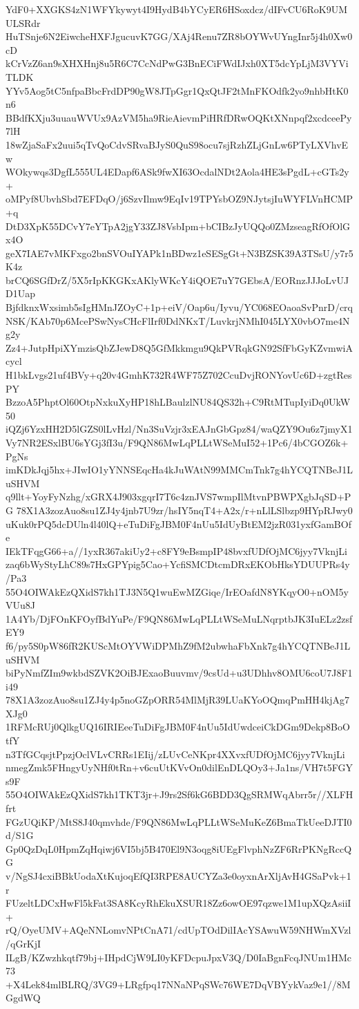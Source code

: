 YdF0+XXGKS4zN1WFYkywyt4I9HydB4bYCyER6HSoxdcz/dIFvCU6RoK9UMULSRdr
HuTSnje6N2EiwcheHXFJgucuvK7GG/XAj4Renu7ZR8bOYWvUYngInr5j4h0Xw0cD
kCrVzZ6an9sXHXHnj8u5R6C7CcNdPwG3BnECiFWdIJxh0XT5dcYpLjM3VYViTLDK
YYv5Aog5tC5nfpaBbcFrdDP90gW8JTpGgr1QxQtJF2tMnFKOdfk2yo9nhbHtK0n6
BBdfKXju3uuauWVUx9AzVM5ha9RieAievmPiHRfDRwOQKtXNnpqf2xcdceePy7lH
18wZjaSaFx2uui5qTvQoCdvSRvaBJyS0QuS98ocu7sjRzhZLjGnLw6PTyLXVhvEw
WOkywqs3DgfL555UL4EDapf6ASk9fwXI63OcdalNDt2Aola4HE3sPgdL+cGTs2y+
oMPyf8UbvhSbd7EFDqO/j6SzvIlmw9EqIv19TPYsbOZ9NJytsjIuWYFLVnHCMP+q
DtD3XpK55DCvY7eYTpA2jgY33ZJ8VsbIpm+bCIBzJyUQQo0ZMzseagRfOfOlGx4O
geX7IAE7vMKFxgo2bnSVOuIYAPk1nBDwz1eSESgGt+N3BZSK39A3TSsU/y7r5K4z
brCQ6SGfDrZ/5X5rIpKKGKxAKlyWKcY4iQOE7uY7GEbsA/EORnzJJJoLvUJD1Uap
BjfdknxWxsimb5sIgHMnJZOyC+1p+eiV/Oap6u/Iyvu/YC068EOaoaSvPnrD/crq
NSK/KAb70p6McePSwNysCHcFlIrf0DdNKxT/LuvkrjNMhI045LYX0vbO7me4Ng2y
Zz4+JutpHpiXYmzisQbZJewD8Q5GfMkkmgu9QkPVRqkGN92SfFbGyKZvmwiAcycl
H1bkLvgs21uf4BVy+q20v4GmhK732R4WF75Z702CcuDvjRONYovUc6D+zgtResPY
BzzoA5PhptOl60OtpNxkuXyHP18hLBaulzlNU84QS32h+C9RtMTupIyiDq0UkW50
iQZj6YzxHH2D5lGZS0lLvHzl/Nn3SuVzjr3xEAJnGbGpz84/waQZY9Ou6z7jmyX1
Vy7NR2ESxlBU6sYGj3fI3u/F9QN86MwLqPLLtWSeMuI52+1Pc6/4bCGOZ6k+PgNs
imKDkJqj5hx+JIwIO1yYNNSEqcHa4kJuWAtN99MMCmTnk7g4hYCQTNBeJ1LuSHVM
q9llt+YoyFyNzhg/xGRX4J903xgqrI7T6c4znJVS7wmpIlMtvnPBWPXgbJqSD+PG
78X1A3zozAuo8su1ZJ4y4jnb7U9zr/hsIY5nqT4+A2x/r+nLlLSlbzp9HYpRJwy0
uKuk0rPQ5dcDUln4l40lQ+eTuDiFgJBM0F4nUu5IdUyBtEM2jzR031yxfGamBOfe
IEkTFqgG66+a//1yxR367akiUy2+c8FY9eBsmpIP48bvxfUDfOjMC6jyy7VknjLi
zaq6bWyStyLhC89s7HxGPYpig5Cao+YcfiSMCDtcmDRxEKObHksYDUUPRs4y/Pa3
55O4OIWAkEzQXidS7kh1TJ3N5Q1wuEwMZGiqe/IrEOafdN8YKqyO0+nOM5yVUu8J
1A4Yb/DjFOnKFOyfBdYuPe/F9QN86MwLqPLLtWSeMuLNqrptbJK3IuELz2zsfEY9
f6/py5S0pW86fR2KUScMtOYVWiDPMhZ9fM2ubwhaFbXnk7g4hYCQTNBeJ1LuSHVM
biPyNmfZIm9wkbdSZVK2OiBJExaoBuuvmv/9csUd+u3UDhhv8OMU6coU7J8F1i49
78X1A3zozAuo8su1ZJ4y4p5noGZpORR54MlMjR39LUaKYoOQmqPmHH4kjAg7XJg0
1RFMcRUj0QlkgUQ16IRIEeeTuDiFgJBM0F4nUu5IdUwdceiCkDGm9Dekp8BoOtfY
n3TfGCqsjtPpzjOclVLvCRRs1EIij/zLUvCeNKpr4XXvxfUDfOjMC6jyy7VknjLi
nmegZmk5FHngyUyNHf0tRn+v6cuUtKVvOn0dilEnDLQOy3+Ja1ns/VH7t5FGYs9F
55O4OIWAkEzQXidS7kh1TKT3jr+J9rs2Sf6kG6BDD3QgSRMWqAbrr5r//XLFHfrt
FGzUQiKP/MtS8J40qmvhde/F9QN86MwLqPLLtWSeMuKeZ6BmaTkUeeDJTI0d/S1G
Gp0QzDqL0HpmZqHqiwj6VI5bj5B470El9N3oqg8iUEgFlvphNzZF6RrPKNgRccQG
v/NgSJ4cxiBBkUodaXtKujoqEfQI3RPE8AUCYZa3e0oyxnArXljAvH4GSaPvk+1r
FUzeltLDCxHwFl5kFat3SA8KcyRhEkuXSUR18Zz6owOE97qzwe1M1upXQzAsiiI+
rQ/OyeUMV+AQeNNLomvNPtCnA71/cdUpTOdDilIAcYSAwuW59NHWmXVzl/qGrKjI
ILgB/KZwzhkqtf79bj+IHpdCjW9LI0yKFDcpuJpxV3Q/D0IaBgnFcqJNUm1HMc73
+X4Lek84mlBLRQ/3VG9+LRgfpq17NNaNPqSWc76WE7DqVBYykVaz9e1//8MGgdWQ
